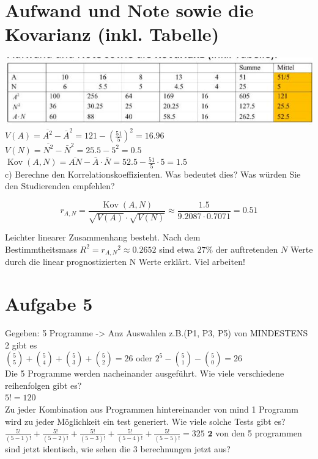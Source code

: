 \documentclass[10pt]{article}
\begin{document}
{\section*{Aufwand und Note sowie die Kovarianz (inkl. Tabelle)}
\includegraphics[width=\linewidth]{images/2024_12_29_0906b02acf849bda8665g-5(7)}\\
$V(A)=\overline{A^{2}}-\bar{A}^{2}=121-\left(\frac{51}{5}\right)^{2}=16.96$\\
$V(N)=\overline{N^{2}}-\bar{N}^{2}=25.5-5^{2}=0.5$\\
$\operatorname{Kov}(A, N)=\overline{A N}-\bar{A} \cdot \bar{N}=52.5-\frac{51}{5} \cdot 5=1.5$\\
c) Berechne den Korrelationskoeffizienten. Was bedeutet dies? Was würden Sie den Studierenden empfehlen?

$$
r_{A, N}=\frac{\operatorname{Kov}(A, N)}{\sqrt{V(A)} \cdot \sqrt{V(N)}} \approx \frac{1.5}{9.2087 \cdot 0.7071}=0.51
$$

Leichter linearer Zusammenhang besteht. Nach dem\\
Bestimmtheitsmass $R^{2}=r_{A, N}{ }^{2} \approx 0.2652$ sind etwa $27 \%$ der auftretenden $N$ Werte durch die linear prognostizierten N Werte erklärt. Viel arbeiten!

\section*{Aufgabe 5}
Gegeben: 5 Programme -> Anz Auswahlen z.B.(P1, P3, P5) von MINDESTENS 2 gibt es\\
$\binom{5}{5}+\binom{5}{4}+\binom{5}{3}+\binom{5}{2}=26$ oder $2^{5}-\binom{5}{1}-\binom{5}{0}=26$\\
Die 5 Programme werden nacheinander ausgeführt. Wie viele verschiedene reihenfolgen gibt es?\\
$5!=120$\\
Zu jeder Kombination aus Programmen hintereinander von mind 1 Programm wird zu jeder Möglichkeit ein test generiert. Wie viele solche Tests gibt es?\\
$\frac{5!}{(5-1)!}+\frac{5!}{(5-2)!}+\frac{5!}{(5-3)!}+\frac{5!}{(5-4)!}+\frac{5!}{(5-5)!}=325$ $\mathbf{2}$ von den 5 programmen sind jetzt identisch, wie sehen die 3 berechnungen jetzt aus?

}
\end{document}
